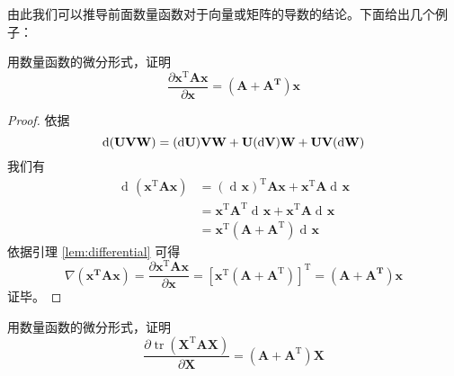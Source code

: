 \documentclass[UTF8,space=auto]{ctexart} %
\DeclareMathOperator{\diff}{d\!}
\begin{document}
由此我们可以推导前面数量函数对于向量或矩阵的导数的结论。下面给出几个例子：

\begin{exam}
用数量函数的微分形式，证明
\[
\frac{\partial \mathbf{x}^{\mathrm{T}} \mathbf{A} \mathbf{x}}{\partial \mathbf{x}}=\left(\mathbf{A}+\mathbf{A}^{\mathbf{T}}\right) \mathbf{x}
\]
\end{exam}

\begin{proof}
依据
\[
\diff\,(\mathbf{UVW})=(\diff \mathbf{U}) \mathbf{VW}+\mathbf{U}(\diff \mathbf{V}) \mathbf{W} + \mathbf{UV}(\diff \mathbf{W}) \\
\]
我们有
\begin{align*}
\diff\left(\mathbf{x}^{\mathrm{T}} \mathbf{A} \mathbf{x}\right)&=(\diff \mathbf{x})^{\mathrm{T}} \mathbf{A} \mathbf{x}+\mathbf{x}^{\mathrm{T}} \mathbf{A} \diff \mathbf{x} \\
&= \mathbf{x}^{\mathrm{T}} \mathbf{A}^{\mathrm{T}} \diff\mathbf{x}+\mathbf{x}^{\mathrm{T}} \mathbf{A} \diff \mathbf{x} \\
&= \mathbf{x}^{\mathrm{T}}\left(\mathbf{A}+\mathbf{A}^{\mathrm{T}}\right) \diff \mathbf{x}
\end{align*}
依据引理 \ref{lem:differential} 可得
\[
\nabla\left(\mathbf{x}^{\mathbf{T}} \mathbf{A} \mathbf{x}\right)=\frac{\partial \mathbf{x}^{\mathrm{T}} \mathbf{A} \mathbf{x}}{\partial \mathbf{x}} = \left[ \mathbf{x}^{\mathrm{T}}\left(\mathbf{A}+\mathbf{A}^{\mathrm{T}}\right) \right]^{\mathrm{T}} = \left(\mathbf{A}+\mathbf{A}^{\mathbf{T}}\right) \mathbf{x}
\]
证毕。
\end{proof}

\begin{exam}
用数量函数的微分形式，证明
\[
\frac{\partial \operatorname{tr}\left(\mathbf{X}^{\mathrm{T}} \mathbf{A} \mathbf{X}\right)}{\partial \mathbf{X}}=\left(\mathbf{A} + \mathbf{A}^{\mathrm{T}}\right) \mathbf{X}
\]
\end{exam}
\end{document}
